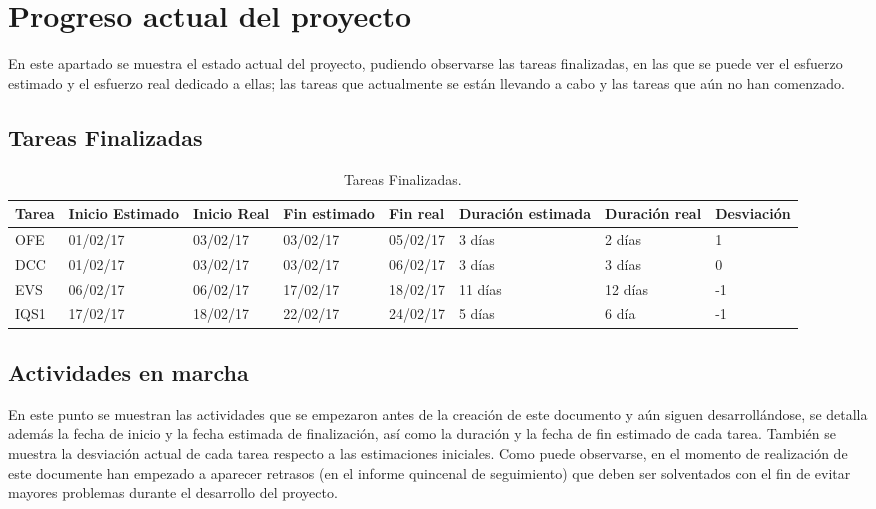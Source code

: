 \section{Progreso actual del proyecto}

\par En este apartado se muestra el estado actual del proyecto, pudiendo observarse las tareas finalizadas, en las que se puede ver el esfuerzo estimado y el esfuerzo real dedicado a ellas; las tareas que actualmente se están llevando a cabo y las tareas que aún no han comenzado.

\subsection{Tareas Finalizadas}
\begin{table}[h]
\begin{center}
\begin{tabular}{ l l l l l l l l }

	Tarea & Inicio Estimado & Inicio Real & Fin estimado & Fin real & Duración estimada & Duración real & Desviación \\ \hline \hline
	OFE & 01/02/17 & 03/02/17 & 03/02/17 & 05/02/17 & 3 días & 2 días & 1 \\ \hline
	DCC & 01/02/17 & 03/02/17 & 03/02/17 & 06/02/17 & 3 días & 3 días  & 0 \\ \hline
	EVS & 06/02/17 & 06/02/17 & 17/02/17 & 18/02/17 & 11 días & 12 días & -1 \\ \hline
	IQS1 & 17/02/17 & 18/02/17 & 22/02/17 & 24/02/17 & 5 días & 6 día & -1 \\ \hline
\end{tabular}
\caption{Tareas Finalizadas.}
\label{tab:Tareas Finalizadas}
\end{center}
\end{table}

\subsection{Actividades en marcha}
\par En este punto se muestran las actividades que se empezaron antes de la creación de este documento y aún siguen desarrollándose, se detalla además la fecha de inicio y la fecha estimada de finalización, así como la duración y la fecha de fin estimado de cada tarea. También se muestra la desviación actual de cada tarea respecto a las estimaciones iniciales. Como puede observarse, en el momento de realización de este documente han empezado a aparecer retrasos (en el informe quincenal de seguimiento) que deben ser solventados con el fin de evitar mayores problemas durante el desarrollo del proyecto.

